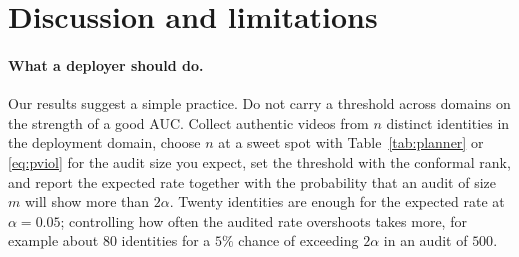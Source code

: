 \section{Discussion and limitations}
\label{sec:discussion}

\paragraph{What a deployer should do.}
Our results suggest a simple practice. Do not carry a threshold across domains on the strength of a good AUC. Collect authentic videos from $n$ distinct identities in the deployment domain, choose $n$ at a sweet spot with Table~\ref{tab:planner} or \eqref{eq:pviol} for the audit size you expect, set the threshold with the conformal rank, and report the expected rate together with the probability that an audit of size $m$ will show more than $2\alpha$. Twenty identities are enough for the expected rate at $\alpha=0.05$; controlling how often the audited rate overshoots takes more, for example about $80$ identities for a $5\%$ chance of exceeding $2\alpha$ in an audit of $500$.


